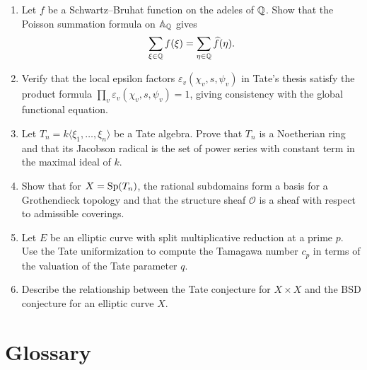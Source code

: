 \begin{enumerate}
    \[
    0 \to E(k)/mE(k) \to \Sel^{(m)}(E/k) \to \Sha(E/k)[m] \to 0.
    \]
    \item [B] Let \(f\) be a Schwartz--Bruhat function on the adeles of \(\mathbb{Q}\). Show that the Poisson summation formula on \(\mathbb{A}_{\mathbb{Q}}\) gives
    \[
    \sum_{\xi \in \mathbb{Q}} f(\xi) = \sum_{\eta \in \mathbb{Q}} \widehat{f}(\eta).
    \]
    \item [I] Verify that the local epsilon factors \(\varepsilon_v(\chi_v, s, \psi_v)\) in Tate's thesis satisfy the product formula \(\prod_v \varepsilon_v(\chi_v, s, \psi_v) = 1\), giving consistency with the global functional equation.
    \item [I] Let \(T_n = k\langle \xi_1, \dots, \xi_n \rangle\) be a Tate algebra. Prove that \(T_n\) is a Noetherian ring and that its Jacobson radical is the set of power series with constant term in the maximal ideal of \(k\).
    \item [I] Show that for \(X = \operatorname{Sp}(T_n)\), the rational subdomains form a basis for a Grothendieck topology and that the structure sheaf \(\mathcal{O}\) is a sheaf with respect to admissible coverings.
    \item [I] Let \(E\) be an elliptic curve with split multiplicative reduction at a prime \(p\). Use the Tate uniformization to compute the Tamagawa number \(c_p\) in terms of the valuation of the Tate parameter \(q\).
    \item [A] Describe the relationship between the Tate conjecture for \(X \times X\) and the BSD conjecture for an elliptic curve \(X\).
\end{enumerate}

\section*{Glossary}

